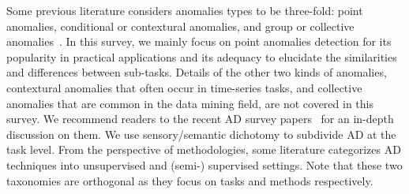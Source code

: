 \smallskip
{}
Some previous literature considers anomalies types to be three-fold: point anomalies, conditional or contextural anomalies, and group or collective anomalies~.
In this survey, we mainly focus on point anomalies detection for its popularity in practical applications and its adequacy to elucidate the similarities and differences between sub-tasks.
Details of the other two kinds of anomalies, \ie contextural anomalies that often occur in time-series tasks, and collective anomalies that are common in the data mining field, are not covered in this survey. We recommend readers to the recent AD survey papers~ for an in-depth discussion on them.
\smallskip
{}
We use sensory/semantic dichotomy to subdivide AD at the task level. From the perspective of methodologies, some literature categorizes AD techniques into unsupervised and (semi-) supervised settings. Note that these two taxonomies are orthogonal as they focus on tasks and methods respectively.

